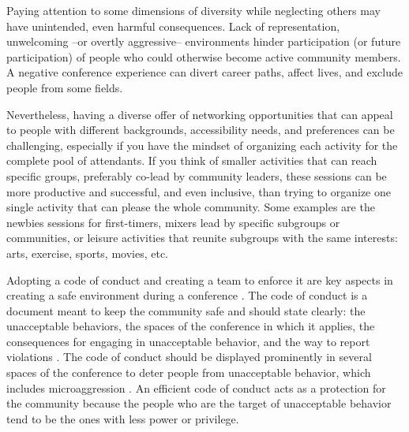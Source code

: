 \documentclass[10pt,letterpaper]{article}
\begin{document}
Paying attention to some dimensions of diversity while neglecting others may have unintended, even harmful consequences. Lack of representation, unwelcoming --or overtly aggressive-- environments hinder participation (or future participation) of people who could otherwise become active community members. A negative conference experience can divert career paths, affect lives, and exclude people from some fields. %

Nevertheless, having a diverse offer of networking opportunities that can appeal to people with different backgrounds, accessibility needs, and preferences can be challenging, especially if you have the mindset of organizing each activity for the complete pool of attendants. If you think of smaller activities that can reach specific groups, preferably co-lead by community leaders, these sessions can be more productive and successful, and even inclusive, than trying to organize one single activity that can please the whole community. Some examples are the newbies sessions for first-timers, mixers lead by specific subgroups or communities, or leisure activities that reunite subgroups with the same interests: arts, exercise, sports, movies, etc.

Adopting a code of conduct and creating a team to enforce it are key aspects in creating a safe environment during a conference \cite{favaroYourScienceConference2016}. The code of conduct is a document meant to keep the community safe and should state clearly: the unacceptable behaviors, the spaces of the conference in which it applies, the consequences for engaging in unacceptable behavior, and the way to report violations \cite{aurora2019}. 
The code of conduct should be displayed prominently in several spaces of the conference to deter people from unacceptable behavior, which includes microaggression .
An efficient code of conduct acts as a protection for the community because the people who are the target of unacceptable behavior tend to be the ones with less power or privilege.
\end{document}

